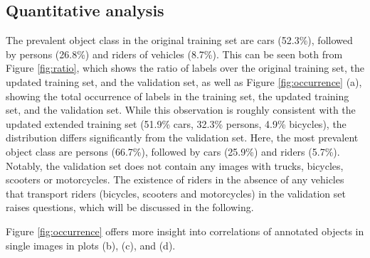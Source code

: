 \documentclass{article}
\begin{document}
\subsection*{Quantitative analysis}
The prevalent object class in the original training set are cars (52.3\%), followed by persons (26.8\%) and riders of vehicles (8.7\%). This can be seen both from Figure \ref{fig:ratio}, which shows the ratio of labels over the original training set, the updated training set, and the validation set, as well as Figure \ref{fig:occurrence} (a), showing the total occurrence of labels in the training set, the updated training set, and the validation set. While this observation is roughly consistent with the updated extended training set (51.9\% cars, 32.3\% persons, 4.9\% bicycles), the distribution differs significantly from the validation set. Here, the most prevalent object class are persons (66.7\%), followed by cars (25.9\%) and riders (5.7\%). Notably, the validation set does not contain any images with trucks, bicycles, scooters or motorcycles. The existence of riders in the absence of any vehicles that transport riders (bicycles, scooters and motorcycles) in the validation set raises questions, which will be discussed in the following.

Figure \ref{fig:occurrence} offers more insight into correlations of annotated objects in single images in plots (b), (c), and (d).
\end{document}
